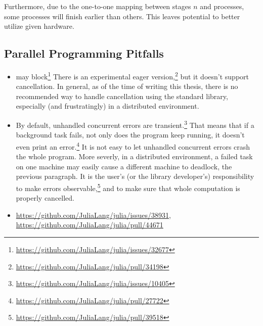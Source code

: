 Furthermore, due to the one-to-one mapping between stages $n$ and processes,
some processes will finish earlier than others.
This leaves potential to better utilize given hardware.

\subsection{Parallel Programming Pitfalls}

\begin{itemize}
  \item
     may block\footnote{\url{https://github.com/JuliaLang/julia/issues/32677}}
    There is an experimental eager version,\footnote{\url{https://github.com/JuliaLang/julia/pull/34198}} but it doesn't support cancellation.
    In general, as of the time of writing this thesis,
    there is no recommended way to handle cancellation using the standard library,
    especially (and frustratingly) in a distributed environment.
  \item
    By default, unhandled concurrent errors are transient.\footnote{%
      \url{https://github.com/JuliaLang/julia/issues/10405}}
    That means that if a background task fails, not only does the program keep running, it doesn't even print an error.\footnote{%
      \url{https://github.com/JuliaLang/julia/pull/27722}}
    It is not easy to let unhandled concurrent errors crash the whole program.
    More severly, in a distributed environment, a failed task on one machine may easily cause a different machine to deadlock,
    \cf the previous paragraph.
    It is the user's (or the library developer's) responsibility to make errors observable,\footnote{%
      \url{https://github.com/JuliaLang/julia/pull/39518}}
    and to make sure that whole computation is properly cancelled.
  \item
    \url{https://github.com/JuliaLang/julia/issues/38931},
    \url{https://github.com/JuliaLang/julia/pull/44671}
\end{itemize}

